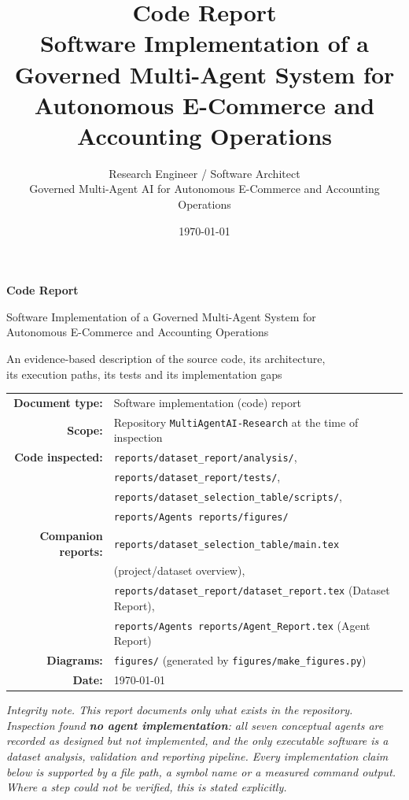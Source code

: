 \documentclass[11pt,a4paper]{article}
\title{\textbf{Code Report}\\[0.4em]
\large Software Implementation of a Governed Multi-Agent System for\\
Autonomous E-Commerce and Accounting Operations}
\author{Research Engineer / Software Architect\\\small Governed Multi-Agent AI for Autonomous E-Commerce and Accounting Operations}
\date{\today}
\newcommand{\code}[1]{\texttt{#1}}
\begin{document}
\begin{titlepage}
\centering
\vspace*{1.2cm}
{\Huge\bfseries Code Report\par}
\vspace{0.5cm}
{\Large Software Implementation of a Governed Multi-Agent System for\\[2pt]
Autonomous E-Commerce and Accounting Operations\par}
\vspace{1.0cm}
{\large An evidence-based description of the source code, its architecture,\\
its execution paths, its tests and its implementation gaps\par}
\vspace{1.6cm}
\vfill
{\small
\begin{tabular}{rl}
\textbf{Document type:} & Software implementation (code) report \\[4pt]
\textbf{Scope:} & Repository \code{MultiAgentAI-Research} at the time of inspection \\[4pt]
\textbf{Code inspected:} & \code{reports/dataset\_report/analysis/}, \\
 & \code{reports/dataset\_report/tests/}, \\
 & \code{reports/dataset\_selection\_table/scripts/}, \\
 & \code{reports/Agents reports/figures/} \\[4pt]
\textbf{Companion reports:} & \code{reports/dataset\_selection\_table/main.tex} \\
 & (project/dataset overview), \\
 & \code{reports/dataset\_report/dataset\_report.tex} (Dataset Report), \\
 & \code{reports/Agents reports/Agent\_Report.tex} (Agent Report) \\[4pt]
\textbf{Diagrams:} & \code{figures/} (generated by \code{figures/make\_figures.py}) \\[4pt]
\textbf{Date:} & \today \\
\end{tabular}
}
\vfill
{\small\itshape Integrity note. This report documents only what exists in the repository. Inspection found \textbf{no agent implementation}: all seven conceptual agents are recorded as \emph{designed but not implemented}, and the only executable software is a dataset analysis, validation and reporting pipeline. Every implementation claim below is supported by a file path, a symbol name or a measured command output. Where a step could not be verified, this is stated explicitly.}
\end{titlepage}
\end{document}
